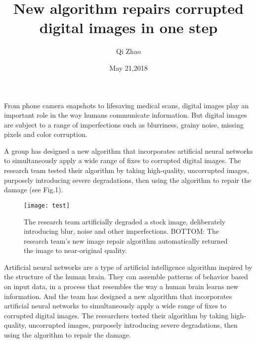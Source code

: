 \documentclass{article}
\author{Qi Zhao}
\date{May 21,2018}
\title{New algorithm repairs corrupted digital images in one step}
\begin{document}
\maketitle
\par From phone camera snapshots\cite{Schwaebel2014Photoscopy} to lifesaving medical scans, digital images play an important role in the way humans communicate information. But digital images are subject to a range of imperfections such as blurriness, grainy noise, missing pixels and color corruption.
\par A group has designed a new algorithm that incorporates artificial neural networks to simultaneously apply a wide range of fixes to corrupted digital images. The research team tested their algorithm by taking high-quality, uncorrupted images, purposely introducing severe degradations, then using the algorithm to repair the damage (see Fig.{\color{red}1}).
\begin{figure}[htbp]
\centering
\texttt{[image: test]}
\caption{ The research team artificially degraded a stock image, deliberately introducing blur, noise and other imperfections. BOTTOM: The research team's new image repair algorithm automatically returned the image to near-original quality.}
\label{1}
\end{figure}

\par Artificial neural networks\cite{Downing1999Evolving} are a type of artificial intelligence algorithm inspired by the structure of the human brain. They can assemble patterns of behavior based on input data, in a process that resembles the way a human brain learns new information. And the team has designed a new algorithm that incorporates artificial neural networks to simultaneously apply a wide range of fixes to corrupted digital images. The researchers tested their algorithm by taking high-quality, uncorrupted images, purposely introducing severe degradations, then using the algorithm to repair the damage.


\end{document}
